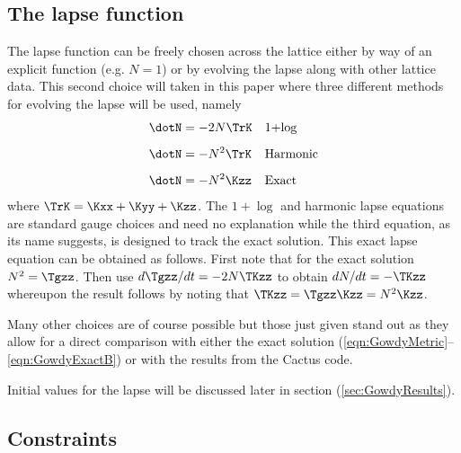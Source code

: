 \documentclass[a4paper,12pt]{article}
\numberwithin{equation}{section}
\begin{document}

\subsection{The lapse function}
\label{sec:GowdyLapse}

The lapse function can be freely chosen across the lattice either by way of an explicit
function (e.g. $N=1$) or by evolving the lapse along with other lattice data. This second
choice will taken in this paper where three different methods for evolving the lapse will be
used, namely
\begin{align}
   \dotN &= -2N\TrK &&\text{1+$\log$}\\[5pt]
   \dotN &= -N^2\TrK &&\text{Harmonic}\\[5pt]
   \dotN &= -N^2\Kzz &&\text{Exact}
\end{align}
where $\TrK = \Kxx + \Kyy + \Kzz$. The $1+\log$ and harmonic lapse equations are standard
gauge choices and need no explanation while the third equation, as its name suggests, is
designed to track the exact solution. This exact lapse equation can be obtained as
follows. First note that for the exact solution $N^2 = \Tgzz$. Then use $d\Tgzz/dt=-2N\TKzz$
to obtain $dN/dt = -\TKzz$ whereupon the result follows by noting that $\TKzz = \Tgzz\Kzz =
N^2 \Kzz$.

Many other choices are of course possible but those just given stand out as they allow for a
direct comparison with either the exact solution
(\ref{eqn:GowdyMetric}--\ref{eqn:GowdyExactB}) or with the results from the Cactus code.

Initial values for the lapse will be discussed later in section (\ref{sec:GowdyResults}).

\subsection{Constraints}
\label{sec:GowdyConstraints}
\end{document}
